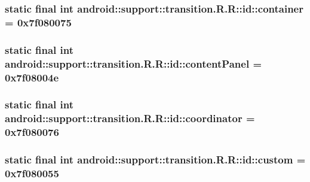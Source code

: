 \hypertarget{classandroid_1_1support_1_1transition_1_1_r_1_1id_7b1ebc6247d2d745d6285cb32b72bf22}{
\subsubsection[{container}]{\setlength{\rightskip}{0pt plus 5cm}static final int android::support::transition.R.R::id::container = 0x7f080075}}
\label{classandroid_1_1support_1_1transition_1_1_r_1_1id_7b1ebc6247d2d745d6285cb32b72bf22}


\hypertarget{classandroid_1_1support_1_1transition_1_1_r_1_1id_1fdcef5e9ac89fba52fb1ada93f4f59d}{
\subsubsection[{contentPanel}]{\setlength{\rightskip}{0pt plus 5cm}static final int android::support::transition.R.R::id::contentPanel = 0x7f08004e}}
\label{classandroid_1_1support_1_1transition_1_1_r_1_1id_1fdcef5e9ac89fba52fb1ada93f4f59d}


\hypertarget{classandroid_1_1support_1_1transition_1_1_r_1_1id_cd1167f50bcd171b8432563c2c7a7e9f}{
\subsubsection[{coordinator}]{\setlength{\rightskip}{0pt plus 5cm}static final int android::support::transition.R.R::id::coordinator = 0x7f080076}}
\label{classandroid_1_1support_1_1transition_1_1_r_1_1id_cd1167f50bcd171b8432563c2c7a7e9f}


\hypertarget{classandroid_1_1support_1_1transition_1_1_r_1_1id_9544320648d964d88212e7394f0f5b92}{
\subsubsection[{custom}]{\setlength{\rightskip}{0pt plus 5cm}static final int android::support::transition.R.R::id::custom = 0x7f080055}}
\label{classandroid_1_1support_1_1transition_1_1_r_1_1id_9544320648d964d88212e7394f0f5b92}


